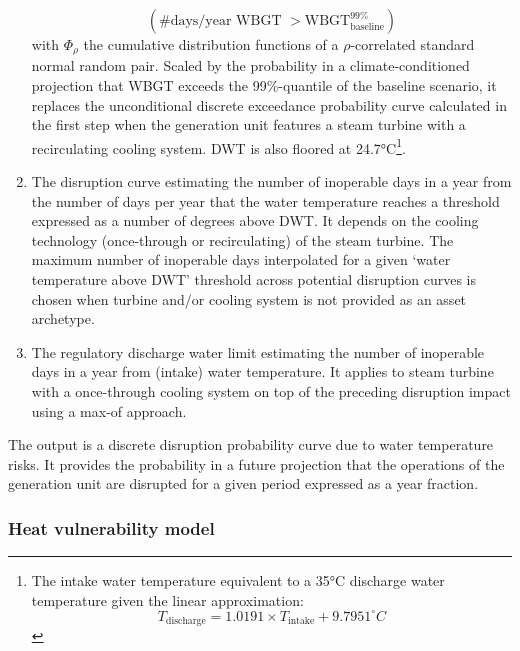 \documentclass[a4paper,11pt]{extarticle} %
\theoremstyle{definition}
\begin{document}
\begin{enumerate}
$${\left(\text{\#days/year WBGT }> \text{WBGT}^{99\%}_{\text{baseline}}\right)}
$$
with $\Phi_{\rho}$ the cumulative distribution functions of a $\rho$-correlated standard normal random pair. Scaled by the probability in a climate-conditioned projection that WBGT exceeds the 99\%-quantile of the baseline scenario, it replaces the unconditional discrete exceedance probability curve calculated in the first step when the generation unit features a steam turbine with a recirculating cooling system. DWT is also floored at 24.7°C\footnote{The intake water temperature equivalent to a 35°C discharge water temperature given the linear approximation:
$$
T_{\text{discharge}}=1.0191\times T_{\text{intake}}+9.7951^{\circ}C
$$
}.
\item The disruption curve estimating the number of inoperable days in a year from the number of days per year that the water temperature reaches a threshold expressed as a number of degrees above DWT. It depends on the cooling technology (once-through or recirculating) of the steam turbine. The maximum number of inoperable days interpolated for a given `water temperature above DWT' threshold across potential disruption curves is chosen when turbine and/or cooling system is not provided as an asset archetype.
\item The regulatory discharge water limit estimating the number of inoperable days in a year from (intake) water temperature. It applies to steam turbine with a once-through cooling system on top of the preceding disruption impact using a max-of approach.
\end{enumerate}
The output is a discrete disruption probability curve due to water temperature risks. It provides the probability in a future projection that the operations of the generation unit are disrupted for a given period expressed as a year fraction.

\subsubsection{Heat vulnerability model}

\label{SubSec:HeatVulnerabilityModel}
\end{document}
